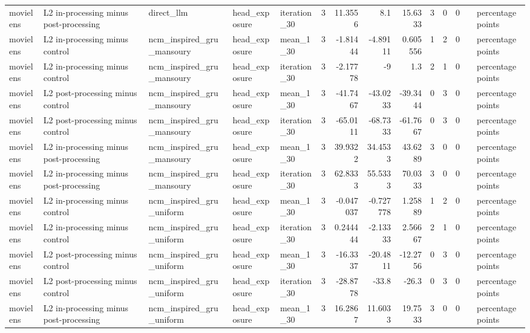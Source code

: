 \begin{table}[htbp!]
\begin{tabular}{lllllrrrrrrrll}
movielens & L2 in-processing minus post-processing & direct\_llm & head\_exposure & iteration\_30 & 3 & 11.3556 & 8.1 & 15.6333 & 3 & 0 & 0 &  & percentage points \\
movielens & L2 in-processing minus control & ncm\_inspired\_gru\_mansoury & head\_exposure & mean\_1\_30 & 3 & -1.81444 & -4.89111 & 0.605556 & 1 & 2 & 0 &  & percentage points \\
movielens & L2 in-processing minus control & ncm\_inspired\_gru\_mansoury & head\_exposure & iteration\_30 & 3 & -2.17778 & -9 & 1.3 & 2 & 1 & 0 &  & percentage points \\
movielens & L2 post-processing minus control & ncm\_inspired\_gru\_mansoury & head\_exposure & mean\_1\_30 & 3 & -41.7467 & -43.0233 & -39.3444 & 0 & 3 & 0 &  & percentage points \\
movielens & L2 post-processing minus control & ncm\_inspired\_gru\_mansoury & head\_exposure & iteration\_30 & 3 & -65.0111 & -68.7333 & -61.7667 & 0 & 3 & 0 &  & percentage points \\
movielens & L2 in-processing minus post-processing & ncm\_inspired\_gru\_mansoury & head\_exposure & mean\_1\_30 & 3 & 39.9322 & 34.4533 & 43.6289 & 3 & 0 & 0 &  & percentage points \\
movielens & L2 in-processing minus post-processing & ncm\_inspired\_gru\_mansoury & head\_exposure & iteration\_30 & 3 & 62.8333 & 55.5333 & 70.0333 & 3 & 0 & 0 &  & percentage points \\
movielens & L2 in-processing minus control & ncm\_inspired\_gru\_uniform & head\_exposure & mean\_1\_30 & 3 & -0.047037 & -0.727778 & 1.25889 & 1 & 2 & 0 &  & percentage points \\
movielens & L2 in-processing minus control & ncm\_inspired\_gru\_uniform & head\_exposure & iteration\_30 & 3 & 0.244444 & -2.13333 & 2.56667 & 2 & 1 & 0 &  & percentage points \\
movielens & L2 post-processing minus control & ncm\_inspired\_gru\_uniform & head\_exposure & mean\_1\_30 & 3 & -16.3337 & -20.4811 & -12.2756 & 0 & 3 & 0 &  & percentage points \\
movielens & L2 post-processing minus control & ncm\_inspired\_gru\_uniform & head\_exposure & iteration\_30 & 3 & -28.8778 & -33.8 & -26.3 & 0 & 3 & 0 &  & percentage points \\
movielens & L2 in-processing minus post-processing & ncm\_inspired\_gru\_uniform & head\_exposure & mean\_1\_30 & 3 & 16.2867 & 11.6033 & 19.7533 & 3 & 0 & 0 &  & percentage points \\

\end{tabular}
\end{table}
